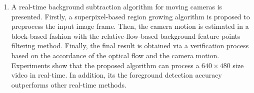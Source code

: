 \begin{eabstract}
\begin{enumerate}
   \item A real-time background subtraction algorithm for moving cameras is presented. Firstly, a superpixel-based region growing algorithm is proposed to preprocess the input image frame. Then, the camera motion is estimated in a block-based fashion with the relative-flow-based background feature points filtering method. Finally, the final result is obtained via a verification process based on the accordance of the optical flow and the camera motion. Experiments show that the proposed algorithm can process a $640 \times 480$ size video in real-time. In addition, its the foreground detection accuracy outperforms other real-time methods.
   \end{enumerate}

\end{eabstract}

